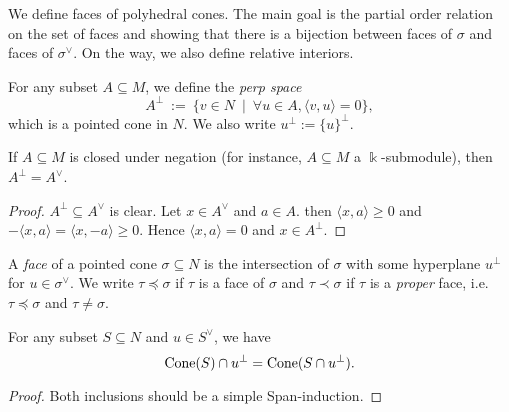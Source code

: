 We define faces of polyhedral cones. The main goal is the partial
order relation on the set of faces and showing that there is a
bijection between faces of \( \sigma \) and faces of \( \sigma^{\vee}
\). On the way, we also define relative interiors.

\begin{definition}
  \label{3-perp}
  \uses{}
  \leanok
  For any subset \( A \subseteq M \), we define the \emph{perp space}
  \[
      A^{\perp}\ :=\ \{v \in N\ \mid\ \forall u \in A, \langle v, u \rangle = 0\},
  \]
  which is a pointed cone in \( N \). We also write \( u^{\perp} :=
  \{u\}^{\perp} \).
\end{definition}

\begin{lemma}
  \label{3-perp-closed-negation}
  \uses{}
  If \( A \subseteq M \) is closed under negation (for instance, \( A
  \subseteq M \) a \( \Bbbk \)-submodule), then \( A^{\perp} =
  A^{\vee} \).
\end{lemma}
\begin{proof}
  \uses{}
  \( A^{\perp} \subseteq A^{\vee} \) is clear. Let \( x \in A^{\vee}
  \) and \( a \in A \). then \( \langle x, a \rangle \geq 0 \) and \(
  -\langle x, a \rangle = \langle x, -a \rangle \geq 0 \). Hence \(
  \langle x, a \rangle = 0 \) and \( x \in A^{\perp} \).
\end{proof}


\begin{definition}
  \label{3-face}
  \leanok
  A \emph{face} of a pointed cone \( \sigma \subseteq N \) is the
  intersection of \( \sigma \) with some hyperplane \( u^{\perp} \)
  for \( u \in \sigma^{\vee} \). We write \( \tau \preceq \sigma \) if
  \( \tau \) is a face of \( \sigma \) and \( \tau \prec \sigma \) if
  \( \tau \) is a \emph{proper} face, i.e. \( \tau \preceq \sigma \)
  and \( \tau \neq \sigma \).
\end{definition}

\begin{proposition}
  \label{3-cone-inter-perp}
  For any subset \( S \subseteq N \) and \( u \in S^{\vee} \), we have
  \[
      \operatorname{Cone}(S) \cap u^{\perp} = \operatorname{Cone}(S \cap u^{\perp}).
  \]
\end{proposition}
\begin{proof}
    Both inclusions should be a simple Span-induction.
\end{proof}

